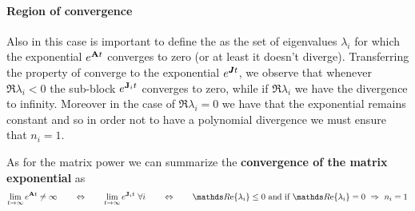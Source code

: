 	\paragraph{Region of convergence} Also in this case is important to define the  as the set of eigenvalues $\lambda_i$ for which the exponential $e^{\mathbf{A} t}$ converges to zero (or at least it doesn't diverge). Transferring the property of converge to the exponential $e^{\pmb{J} t}$, we observe that whenever $\Re{\lambda_i} < 0$ the sub-block $e^{\mathbf{J}_it}$ converges to zero, while if $\Re{\lambda_i}$ we have the divergence to infinity. Moreover in the case of $\Re{\lambda_i} = 0$ we have that the exponential remains constant and so in order not to have a polynomial divergence we must ensure that $n_i = 1$.
	
	As for the matrix power we can summarize the \textbf{convergence of the matrix exponential} as
	\begin{equation}
		\lim_{t\rightarrow\infty} e^{\A t} \neq \infty \qquad \Leftrightarrow \qquad \lim_{t\rightarrow\infty} e^{\mat J_i t} \ \forall i \qquad \Leftrightarrow \qquad \Re{\lambda_i} \leq 0 \textrm{ and if } \Re{\lambda_i} = 0 \ \Rightarrow \ n_i = 1
	\end{equation} 
	
	
	
	
	
	
	
	
	
	
	
	
	
	
	
	
	
	
	
	
	
	
	
	
	
	
	
	
	